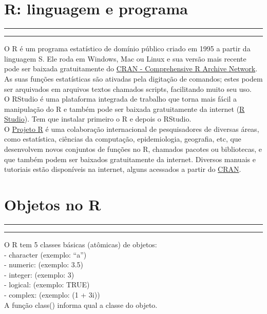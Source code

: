 \documentclass[
  letterpaper,
  DIV=11,
  numbers=noendperiod]{scrreprt}
\begin{document}

\chapter{R: linguagem e programa}\label{r-linguagem-e-programa}

\begin{center}\rule{0.5\linewidth}{0.5pt}\end{center}

\begin{center}\rule{0.5\linewidth}{0.5pt}\end{center}

O R é um programa estatístico de domínio público criado em 1995 a partir
da linguagem S. Ele roda em Windows, Mac ou Linux e sua versão mais
recente pode ser baixada gratuitamente do
\href{https://cran.r-project.org/}{CRAN - Comprehensive R Archive
Network}. As suas funções estatísticas são ativadas pela digitação de
comandos; estes podem ser arquivados em arquivos textos chamados
scripts, facilitando muito seu uso.\\
O RStudio é uma plataforma integrada de trabalho que torna mais fácil a
manipulação do R e também pode ser baixada gratuitamente da internet
(\href{https://rstudio.com/}{R Studio}). Tem que instalar primeiro o R e
depois o RStudio.\\
O \href{http://www.r-project.org/}{Projeto R} é uma colaboração
internacional de pesquisadores de diversas áreas, como estatística,
ciências da computação, epidemiologia, geografia, etc, que desenvolvem
novos conjuntos de funções no R, chamados pacotes ou bibliotecas, e que
também podem ser baixados gratuitamente da internet. Diversos manuais e
tutoriais estão disponíveis na internet, alguns acessados a partir do
\href{https://cran.r-project.org/}{CRAN}.


\chapter{Objetos no R}\label{objetos-no-r}

\begin{center}\rule{0.5\linewidth}{0.5pt}\end{center}

\begin{center}\rule{0.5\linewidth}{0.5pt}\end{center}

O R tem 5 classes básicas (atômicas) de objetos:\\
- character (exemplo: ``a'')\\
- numeric: (exemplo: 3.5)\\
- integer: (exemplo: 3)\\
- logical: (exemplo: TRUE)\\
- complex: (exemplo: (1 + 3i))\\
A função class() informa qual a classe do objeto.
\end{document}

